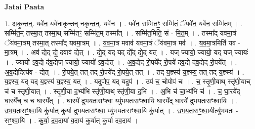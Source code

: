 \documentclass[17pt]{extarticle}
\begin{document}
\textbf{Jatai Paata} \newline

1. अ॒कृ॒न्त॒न्॒. यवे॑न॒ यवे॑नाकृन्तन् नकृन्त॒न्॒. यवे॑न । . यवे॑न॒ सम्मि॑तꣳ॒॒ सम्मि॑तं॒ ॅयवे॑न॒ यवे॑न॒ सम्मि॑तम् । . सम्मि॑त॒म् तस्मा॒त् तस्मा॒थ् सम्मि॑तꣳ॒॒ सम्मि॑त॒म् तस्मा᳚त् । . सम्मि॑त॒मिति॒ सं - मि॒त॒म् । . तस्मा᳚द् यवमा॒त्रं ॅय॑वमा॒त्रम् तस्मा॒त् तस्मा᳚द् यवमा॒त्रम् । . य॒व॒मा॒त्र मवाव॑ यवमा॒त्रं ॅय॑वमा॒त्र मव॑ । . य॒व॒मा॒त्रमिति॑ यव - मा॒त्रम् । . अव॑ द्येद् द्ये॒ दवाव॑ द्येत् । . द्ये॒द् यद् यद् द्ये᳚द् द्ये॒द् यत् । . यज् ज्यायो॒ ज्यायो॒ यद् यज् ज्यायः॑ । . ज्यायो॑ ऽव॒द्ये द॑व॒द्येज् ज्यायो॒ ज्यायो॑ ऽव॒द्येत् । . अ॒व॒द्येद् रो॒पये᳚द् रो॒पये॑ दव॒द्ये द॑व॒द्येद् रो॒पये᳚त् । . अ॒व॒द्येदित्य॑व - द्येत् । . रो॒पये॒त् तत् तद् रो॒पये᳚द् रो॒पये॒त् तत् । . तद् य॒ज्ञ्स्य॑ य॒ज्ञ्स्य॒ तत् तद् य॒ज्ञ्स्य॑ । . य॒ज्ञ्स्य॒ यद् यद् य॒ज्ञ्स्य॑ य॒ज्ञ्स्य॒ यत् । . यदुपोप॒ यद् यदुप॑ । . उप॑ च॒ चोपोप॑ च । . च॒ स्तृ॒णी॒याथ् स्तृ॑णी॒याच् च॑ च स्तृणी॒यात् । . स्तृ॒णी॒या द॒भ्य॑भि स्तृ॑णी॒याथ् स्तृ॑णी॒या द॒भि । . अ॒भि च॑ चा॒भ्य॑भि च॑ । . च॒ घा॒रये᳚द् घा॒रये᳚च् च च घा॒रये᳚त् । . घा॒रये॑ दुभयतःसꣳश्वा॒ य्यु॑भयतःसꣳश्वा॒यि घा॒रये᳚द् घा॒रये॑ दुभयतःसꣳश्वा॒यि । . उ॒भ॒य॒तः॒सꣳ॒॒श्वा॒यि कु॑र्यात् कुर्या दुभयतःसꣳश्वा॒ य्यु॑भयतःसꣳश्वा॒यि कु॑र्यात् । . उ॒भ॒य॒तः॒सꣳ॒॒श्वा॒यीत्यु॑भयतः - सꣳ॒॒श्वा॒यि । . कु॒र्या॒ द॒व॒दाया॑ व॒दाय॑ कुर्यात् कुर्या दव॒दाय॑ । \newline
\end{document}

